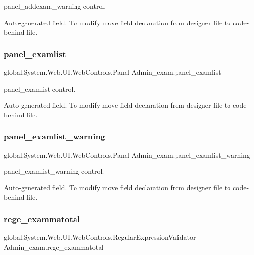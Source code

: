 panel\+\_\+addexam\+\_\+warning control. 

Auto-\/generated field. To modify move field declaration from designer file to code-\/behind file. \mbox{\label{class_admin__exam_a8211626ff1add9eac5593e12a230b2e3}} 
\subsubsection{\texorpdfstring{panel\_examlist}{panel\_examlist}}
{\footnotesize\ttfamily global.\+System.\+Web.\+U\+I.\+Web\+Controls.\+Panel Admin\+\_\+exam.\+panel\+\_\+examlist\hspace{0.3cm}{\ttfamily [protected]}}



panel\+\_\+examlist control. 

Auto-\/generated field. To modify move field declaration from designer file to code-\/behind file. \mbox{\label{class_admin__exam_a7a6862e10b7bbacd8ffb44570bc4e7f4}} 
\subsubsection{\texorpdfstring{panel\_examlist\_warning}{panel\_examlist\_warning}}
{\footnotesize\ttfamily global.\+System.\+Web.\+U\+I.\+Web\+Controls.\+Panel Admin\+\_\+exam.\+panel\+\_\+examlist\+\_\+warning\hspace{0.3cm}{\ttfamily [protected]}}



panel\+\_\+examlist\+\_\+warning control. 

Auto-\/generated field. To modify move field declaration from designer file to code-\/behind file. \mbox{\label{class_admin__exam_add929caada4c50f0f7462fa9a304e5b3}} 
\subsubsection{\texorpdfstring{rege\_exammatotal}{rege\_exammatotal}}
{\footnotesize\ttfamily global.\+System.\+Web.\+U\+I.\+Web\+Controls.\+Regular\+Expression\+Validator Admin\+\_\+exam.\+rege\+\_\+exammatotal\hspace{0.3cm}{\ttfamily [protected]}}



